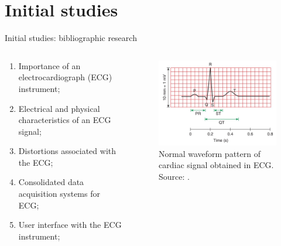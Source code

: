 \section{Initial studies}

\begin{frame}{Initial studies: bibliographic research}
  \begin{columns}[onlytextwidth]
    \begin{column}{0.5\textwidth} 
        \begin{enumerate}
            \item Importance of an electrocardiograph (ECG) instrument;
            \item Electrical and physical characteristics of an ECG signal;
            \item Distortions associated with the ECG;
            \item Consolidated data acquisition systems for ECG;
            \item User interface with the ECG instrument;
        \end{enumerate}
      \end{column}
      
      \begin{column}{0.5\textwidth}
          \begin{figure}[H]
          \caption{Normal waveform pattern of cardiac signal obtained in ECG. Source: \cite{khandpur2019compendium}.}          \begin{center}
                \includegraphics[width=6cm]{images/cardiac_signal.JPG}  
            \end{center}
            \label{fig:1} 
            \end{figure}
      \end{column}
  \end{columns}
\end{frame}

